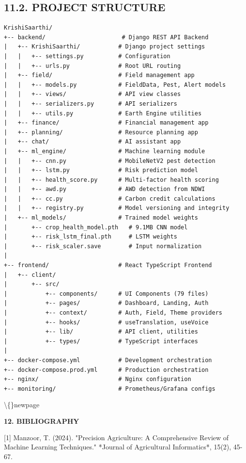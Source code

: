 \documentclass[12pt, a4paper]{report}
\begin{document}
\begin{enumerate}[leftmargin=*]
\begin{enumerate}[leftmargin=*]
\section{11.2. PROJECT STRUCTURE}
\begin{Verbatim}[fontsize=\small]
KrishiSaarthi/
+-- backend/                      # Django REST API Backend
|   +-- KrishiSaarthi/           # Django project settings
|   |   +-- settings.py          # Configuration
|   |   +-- urls.py              # Root URL routing
|   +-- field/                   # Field management app
|   |   +-- models.py            # FieldData, Pest, Alert models
|   |   +-- views/               # API view classes
|   |   +-- serializers.py       # API serializers
|   |   +-- utils.py             # Earth Engine utilities
|   +-- finance/                 # Financial management app
|   +-- planning/                # Resource planning app
|   +-- chat/                    # AI assistant app
|   +-- ml_engine/               # Machine learning module
|   |   +-- cnn.py               # MobileNetV2 pest detection
|   |   +-- lstm.py              # Risk prediction model
|   |   +-- health_score.py      # Multi-factor health scoring
|   |   +-- awd.py               # AWD detection from NDWI
|   |   +-- cc.py                # Carbon credit calculations
|   |   +-- registry.py          # Model versioning and integrity
|   +-- ml_models/               # Trained model weights
|       +-- crop_health_model.pth   # 9.1MB CNN model
|       +-- risk_lstm_final.pth     # LSTM weights
|       +-- risk_scaler.save        # Input normalization
|
+-- frontend/                    # React TypeScript Frontend
|   +-- client/
|       +-- src/
|           +-- components/      # UI Components (79 files)
|           +-- pages/           # Dashboard, Landing, Auth
|           +-- context/         # Auth, Field, Theme providers
|           +-- hooks/           # useTranslation, useVoice
|           +-- lib/             # API client, utilities
|           +-- types/           # TypeScript interfaces
|
+-- docker-compose.yml           # Development orchestration
+-- docker-compose.prod.yml      # Production orchestration
+-- nginx/                       # Nginx configuration
+-- monitoring/                  # Prometheus/Grafana configs
\end{Verbatim}
\textbackslash\{\}newpage

\begin{center}
{\fontsize{14}{17}\bfseries 12. BIBLIOGRAPHY}\\
\end{center}
[1] Manzoor, T. (2024). "Precision Agriculture: A Comprehensive Review of Machine Learning Techniques." *Journal of Agricultural Informatics*, 15(2), 45-67.


\end{enumerate}
\end{enumerate}
\end{document}
